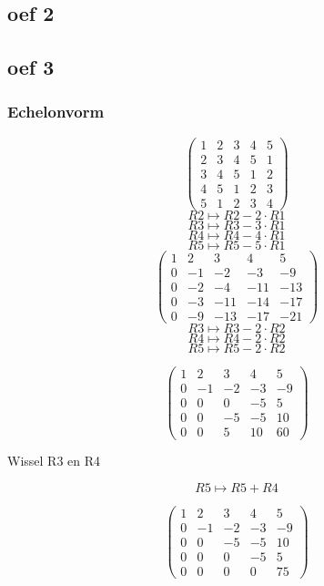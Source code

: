 \documentclass[10pt,a4paper]{article}
\begin{document}
\subsection*{oef 2}

\subsection*{oef 3}
\subsubsection*{Echelonvorm}
\[
\begin{pmatrix}
1 &  2 &  3 &  4 &  5\\
2 &  3 &  4 &  5 &  1\\
3 &  4 &  5 &  1 &  2\\
4 &  5 &  1 &  2 &  3\\
5 &  1 &  2 &  3 &  4 
\end{pmatrix}
\]
\[ R2 \longmapsto R2 -2\cdot R1\]
\[ R3 \longmapsto R3 -3\cdot R1\]
\[ R4 \longmapsto R4 -4\cdot R1\]
\[ R5 \longmapsto R5 -5\cdot R1\]
\[
\begin{pmatrix}
1 &  2 &  3 &  4 &  5 \\
0 & -1 & -2 & -3 & -9 \\
0 & -2 & -4 & -11& -13\\
0 & -3 & -11& -14& -17\\
0 & -9 & -13& -17& -21
\end{pmatrix}
\]
\[ R3 \longmapsto R3 -2\cdot R2\]
\[ R4 \longmapsto R4 -2\cdot R2\]
\[ R5 \longmapsto R5 -2\cdot R2\]

\[
\begin{pmatrix}
1 &  2 &  3 &  4 &  5\\
0 & -1 & -2 & -3 & -9\\
0 &  0 &  0 & -5 &  5\\
0 &  0 & -5 & -5 & 10\\
0 &  0 &  5 & 10 & 60 
\end{pmatrix}
\]
\begin{center}
Wissel R3 en R4
\end{center}
\[ R5 \longmapsto R5 + R4\]

\[
\begin{pmatrix}
1 &  2 &  3 &  4 &  5\\
0 & -1 & -2 & -3 & -9\\
0 &  0 & -5 & -5 & 10\\
0 &  0 &  0 & -5 &  5\\
0 &  0 &  0 &  0 & 75 
\end{pmatrix}
\]
\end{document}
